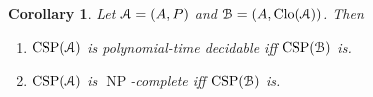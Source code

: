 \documentclass{amsart}
\theoremstyle{plain}
\newtheorem{corollary}[theorem]{Corollary}
\theoremstyle{definition}
\theoremstyle{remark}
\DeclareMathOperator{\Clo}{Clo}
\DeclareMathOperator{\CSP}{CSP}
\DeclareMathOperator{\NP}{NP}
\begin{document}
\begin{corollary}
    Let $\EuScript{A}=(A,P)$ and $\EuScript{B}=(A, \Clo(\EuScript{A}))$. 
    Then 
    \begin{enumerate}
        \item $\CSP(\EuScript{A})$ is polynomial-time decidable iff $\CSP(\EuScript{B})$ is. 
        \item $\CSP(\EuScript{A})$ is $\NP$-complete iff $\CSP(\EuScript{B})$ is. 
    \end{enumerate}
\end{corollary}
\end{document}

